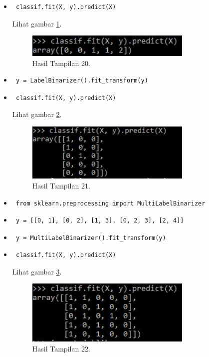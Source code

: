\begin{enumerate}
\begin{itemize}
\item\begin{verbatim} classif.fit(X, y).predict(X)\end{verbatim} Lihat gambar \ref{29}.
\begin{figure}[!htbp]\centerline{\includegraphics[width=0.75\textwidth]{figures/huda/29.JPG}}\caption{Hasil Tampilan 20.}\label{29}\end{figure}
\item\begin{verbatim} y = LabelBinarizer().fit_transform(y)\end{verbatim}
\item\begin{verbatim} classif.fit(X, y).predict(X)\end{verbatim} Lihat gambar \ref{30}.
\begin{figure}[!htbp]\centerline{\includegraphics[width=0.75\textwidth]{figures/huda/30.JPG}}\caption{Hasil Tampilan 21.}\label{30}\end{figure}
\item\begin{verbatim} from sklearn.preprocessing import MultiLabelBinarizer\end{verbatim}
\item\begin{verbatim} y = [[0, 1], [0, 2], [1, 3], [0, 2, 3], [2, 4]]\end{verbatim}
\item\begin{verbatim} y = MultiLabelBinarizer().fit_transform(y)\end{verbatim}
\item\begin{verbatim} classif.fit(X, y).predict(X)\end{verbatim} Lihat gambar \ref{31}.
\begin{figure}[!htbp]\centerline{\includegraphics[width=0.75\textwidth]{figures/huda/31.JPG}}\caption{Hasil Tampilan 22.}\label{31}\end{figure}
\end{itemize}
\end{enumerate}

